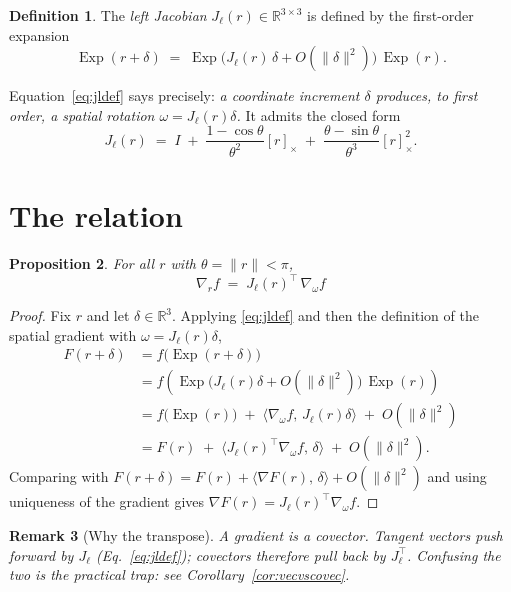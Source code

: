 \documentclass[11pt]{article}
\newtheorem{proposition}{Proposition}
\newtheorem{remark}[proposition]{Remark}
\theoremstyle{definition}
\newtheorem{definition}[proposition]{Definition}
\DeclareMathOperator{\Exp}{Exp}
\newcommand{\R}{\mathbb{R}}
\newcommand{\ip}[2]{\langle #1,\, #2 \rangle}
\newcommand{\skewm}[1]{[#1]_{\times}}
\newcommand{\Jl}{J_{\ell}}
\begin{document}
\begin{definition}
The \emph{left Jacobian} $\Jl(r)\in\R^{3\times3}$ is defined by the first-order
expansion
\begin{equation}\label{eq:jldef}
  \Exp(r+\delta) \;=\; \Exp\!\big(\Jl(r)\,\delta + O(\lVert\delta\rVert^{2})\big)\,\Exp(r).
\end{equation}
\end{definition}

Equation~\eqref{eq:jldef} says precisely: \emph{a coordinate increment $\delta$
produces, to first order, a spatial rotation $\omega = \Jl(r)\delta$.}
It admits the closed form
\begin{equation}\label{eq:jlclosed}
  \Jl(r) \;=\; I \;+\; \frac{1-\cos\theta}{\theta^{2}}\skewm{r}
              \;+\; \frac{\theta-\sin\theta}{\theta^{3}}\skewm{r}^{2}.
\end{equation}

\section{The relation}

\begin{proposition}\label{prop:main}
For all $r$ with $\theta=\lVert r\rVert<\pi$,
\[
  \boxed{\;\nabla_r f \;=\; \Jl(r)^{\!\top}\,\nabla_\omega f\;}
\]
\end{proposition}

\begin{proof}
Fix $r$ and let $\delta\in\R^3$. Applying \eqref{eq:jldef} and then the
definition of the spatial gradient with $\omega=\Jl(r)\delta$,
\begin{align*}
  F(r+\delta)
    &= f\!\big(\Exp(r+\delta)\big) \\
    &= f\!\left(\Exp\big(\Jl(r)\delta + O(\lVert\delta\rVert^{2})\big)\,\Exp(r)\right)\\
    &= f\!\big(\Exp(r)\big) \;+\; \ip{\nabla_\omega f}{\Jl(r)\delta} \;+\; O(\lVert\delta\rVert^{2})\\
    &= F(r) \;+\; \ip{\Jl(r)^{\!\top}\nabla_\omega f}{\delta} \;+\; O(\lVert\delta\rVert^{2}).
\end{align*}
Comparing with $F(r+\delta) = F(r) + \ip{\nabla F(r)}{\delta} + O(\lVert\delta\rVert^2)$
and using uniqueness of the gradient gives $\nabla F(r) = \Jl(r)^{\!\top}\nabla_\omega f$.
\end{proof}

\begin{remark}[Why the transpose]
A gradient is a \emph{covector}. Tangent vectors push forward by $\Jl$
(Eq.~\eqref{eq:jldef}); covectors therefore pull back by $\Jl^{\!\top}$. Confusing
the two is the practical trap: see Corollary~\ref{cor:vecvscovec}.
\end{remark}
\end{document}
